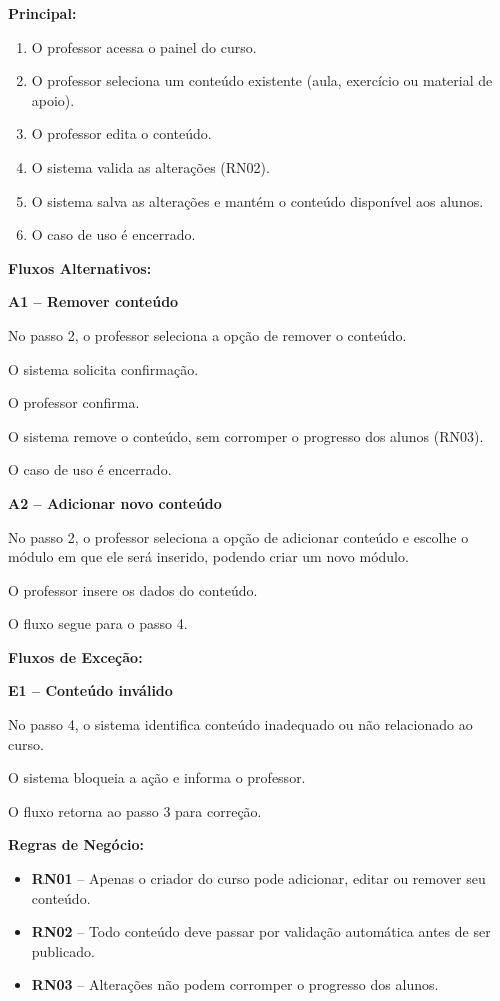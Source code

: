 \documentclass[11pt,a4paper]{article}
\newcommand{\campo}[1]{\textbf{#1:}~}
\newcommand{\fluxotitulo}[1]{\par\needspace{8\baselineskip}\medskip\hspace*{1.5em}\textbf{#1}\par\nopagebreak}
\newcommand{\subfluxo}[1]{\par\needspace{4\baselineskip}\smallskip\hspace*{1.5em}\textbf{#1}\par\nopagebreak}
\newenvironment{principal}
  {\begin{enumerate}[leftmargin=4.5em,itemsep=0pt,topsep=2pt]}
  {\end{enumerate}}
\newenvironment{passos}
  {\begin{description}[leftmargin=4.5em,labelindent=3em,itemsep=0pt,topsep=2pt,
     font=\normalfont\bfseries,style=sameline]}
  {\end{description}}
\newcommand{\passo}[1]{\item[#1 -]}
\newenvironment{itens}
  {\begin{itemize}[leftmargin=3em,itemsep=0pt,topsep=2pt]}
  {\end{itemize}}
\begin{document}
  \fluxotitulo{Principal:}
  \begin{principal}
    \item O professor acessa o painel do curso.
    \item O professor seleciona um conteúdo existente (aula, exercício ou
    material de apoio).
    \item O professor edita o conteúdo.
    \item O sistema valida as alterações (RN02).
    \item O sistema salva as alterações e mantém o conteúdo disponível aos
    alunos.
    \item O caso de uso é encerrado.
  \end{principal}

  \fluxotitulo{Fluxos Alternativos:}

  \subfluxo{A1 -- Remover conteúdo}
  \begin{passos}
    \passo{A1.1} No passo 2, o professor seleciona a opção de remover o
    conteúdo.
    \passo{A1.2} O sistema solicita confirmação.
    \passo{A1.3} O professor confirma.
    \passo{A1.4} O sistema remove o conteúdo, sem corromper o progresso dos
    alunos (RN03).
    \passo{A1.5} O caso de uso é encerrado.
  \end{passos}

  \subfluxo{A2 -- Adicionar novo conteúdo}
  \begin{passos}
    \passo{A2.1} No passo 2, o professor seleciona a opção de adicionar
    conteúdo e escolhe o módulo em que ele será inserido, podendo criar um novo
    módulo.
    \passo{A2.2} O professor insere os dados do conteúdo.
    \passo{A2.3} O fluxo segue para o passo 4.
  \end{passos}

  \fluxotitulo{Fluxos de Exceção:}

  \subfluxo{E1 -- Conteúdo inválido}
  \begin{passos}
    \passo{E1.1} No passo 4, o sistema identifica conteúdo inadequado ou não
    relacionado ao curso.
    \passo{E1.2} O sistema bloqueia a ação e informa o professor.
    \passo{E1.3} O fluxo retorna ao passo 3 para correção.
  \end{passos}

  \campo{Regras de Negócio}
  \begin{itens}
    \item \textbf{RN01} -- Apenas o criador do curso pode adicionar, editar ou
    remover seu conteúdo.
    \item \textbf{RN02} -- Todo conteúdo deve passar por validação automática
    antes de ser publicado.
    \item \textbf{RN03} -- Alterações não podem corromper o progresso dos alunos.
  \end{itens}
\end{document}
